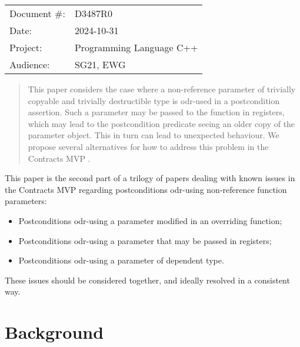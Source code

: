 \begin{tabular}{ll}
Document \#: & D3487R0 \\
Date: &2024-10-31 \\
Project: & Programming Language C++ \\
Audience: & SG21, EWG
\end{tabular}

\begin{abstract}
This paper considers the case where a non-reference parameter of trivially copyable and trivially destructible type is odr-used in a postcondition assertion. Such a parameter may be passed to the function in registers, which may lead to the postcondition predicate seeing an older copy of the parameter object. This in turn can lead to unexpected behaviour. We propose several alternatives for how to address this problem in the Contracts MVP \cite{P2900R10}.
\end{abstract}







This paper is the second part of a trilogy of papers dealing with known issues in the Contracts MVP \cite{P2900R10} regarding postconditions odr-using non-reference function parameters:
\begin{itemize}
\item \cite{D3484R1} Postconditions odr-using a parameter modified in an overriding function;
\item \cite{D3487R0} Postconditions odr-using a parameter that may be passed in registers;
\item \cite{D3489R0} Postconditions odr-using a parameter of dependent type.
\end{itemize}
These issues should be considered together, and ideally resolved in a consistent way.

\section{Background}
\label{bg}

